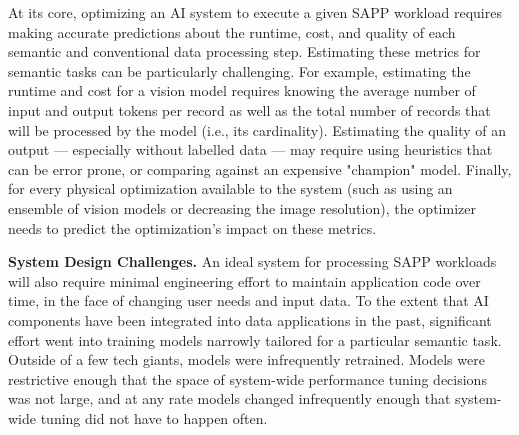 At its core, optimizing an AI system to execute a given SAPP workload requires making accurate predictions about the runtime, cost, and quality of each semantic and conventional data processing step. Estimating these metrics for semantic tasks can be particularly challenging. For example, estimating the runtime and cost for a vision model requires knowing the average number of input and output tokens per record as well as the total number of records that will be processed by the model (i.e., its cardinality). Estimating the quality of an output --- especially without labelled data --- may require using heuristics that can be error prone, or comparing against an expensive "champion" model. Finally, for every physical optimization available to the system (such as using an ensemble of vision models or decreasing the image resolution), the optimizer needs to predict the optimization's impact on these metrics.



{\bf System Design Challenges.} An ideal system for processing SAPP workloads will also require minimal engineering effort to maintain application code over time, in the face of changing user needs and input data. To the extent that AI components have been integrated into data applications in the past, significant effort went into training models narrowly tailored for a particular semantic task. Outside of a few tech giants, models were infrequently retrained. Models were restrictive enough that the space of system-wide performance tuning decisions was not large, and at any rate models changed infrequently enough that system-wide tuning did not have to happen often.

